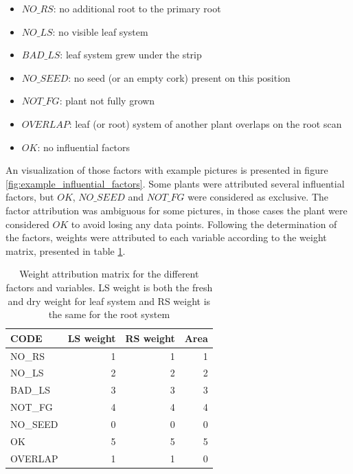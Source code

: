 \begin{itemize}
\item $NO\_RS$: no additional root to the primary root
\item $NO\_LS$: no visible leaf system 
\item $BAD\_LS$: leaf system grew under the strip
\item  $NO\_SEED$: no seed (or an empty cork) present on this position
\item $NOT\_FG$: plant not fully grown
\item $OVERLAP$: leaf (or root) system of another plant overlaps on the root scan
\item $OK$: no influential factors
\end{itemize} 

An visualization of those factors with example pictures is presented in figure \ref{fig:example_influential_factors}. Some plants were attributed several influential factors, but $OK$, $NO\_SEED$ and $NOT\_FG$ were considered as exclusive. The factor attribution was ambiguous for some pictures, in those cases the plant were considered $OK$ to avoid losing any data points.
Following the determination of the factors, weights were attributed to each variable according to the weight matrix, presented in table \ref{tab:weight_attribution_matrix}.

\begin{table}[htbp]
  \centering
  \caption{Weight attribution matrix for the different factors and variables. LS weight is both the fresh and dry weight for leaf system and RS weight is the same for the root system}
    \begin{tabular}{lrrr}
    \toprule
    CODE  & \multicolumn{1}{l}{LS weight} & \multicolumn{1}{l}{RS weight} & \multicolumn{1}{l}{Area} \\
    \midrule
    NO\_RS & 1     & 1     & 1 \\
    NO\_LS & 2     & 2     & 2 \\
    BAD\_LS & 3     & 3     & 3 \\
    NOT\_FG & 4     & 4     & 4 \\
    \textcolor[rgb]{ 1,  0,  0}{NO\_SEED} & \textcolor[rgb]{ 1,  0,  0}{0} & \textcolor[rgb]{ 1,  0,  0}{0} & \textcolor[rgb]{ 1,  0,  0}{0} \\
    \textcolor[rgb]{ 0,  .69,  .314}{OK} & \textcolor[rgb]{ 0,  .69,  .314}{5} & \textcolor[rgb]{ 0,  .69,  .314}{5} & \textcolor[rgb]{ 0,  .69,  .314}{5} \\
    OVERLAP & 1     & 1     & 0 \\
    \bottomrule
    \end{tabular}%
  \label{tab:weight_attribution_matrix}%
\end{table}%


